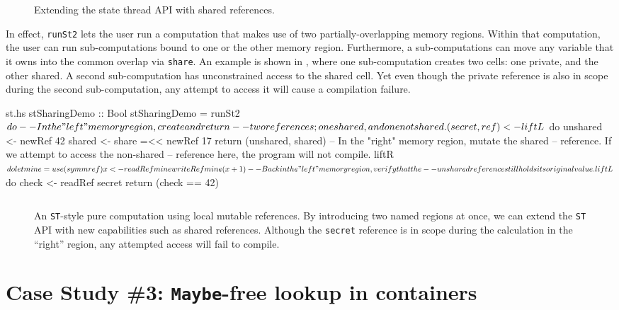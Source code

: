 \documentclass[format=sigplan, review=false, screen=true]{acmart}
\begin{document}
\begin{figure}
  \inputminted{haskell}{st2.hs}
  \caption{Extending the state thread API with shared references.\label{st-sharing-api}}
\end{figure}
In effect, \texttt{runSt2} lets the user run a computation that makes use of
two partially-overlapping memory regions. Within that computation, the user
can run sub-computations bound to one or the other memory region. Furthermore,
a sub-computations can move any variable that it owns into the common overlap
via \texttt{share}. An example is shown in , where one sub-computation
creates two cells: one private, and the other shared. A second sub-computation has unconstrained
access to the shared cell. Yet even though the private reference is also in scope during
the second sub-computation, any attempt to access it will cause a compilation failure.

\begin{filecontents*}{st.hs}
stSharingDemo :: Bool
stSharingDemo = runSt2 $ do
  -- In the "left" memory region, create and return
  -- two references; one shared, and one not shared.
  (secret, ref) <- liftL $ do
      unshared <- newRef 42
      shared   <- share =<< newRef 17
      return (unshared, shared)
  -- In the "right" memory region, mutate the shared
  -- reference. If we attempt to access the non-shared
  -- reference here, the program will not compile.
  liftR $ do
      let mine = use (symm ref)
      x <- readRef mine
      writeRef mine (x + 1)
  -- Back in the "left" memory region, verify that the
  -- unshared reference still holds its original value.
  liftL $ do
      check <- readRef secret
      return (check == 42)
\end{filecontents*}

\begin{figure}
  \inputminted{haskell}{st.hs}
  \caption{An \texttt{ST}-style pure computation using local mutable
    references. By introducing two named regions at once, we can extend
    the \texttt{ST} API with new capabilities such as shared references.
    Although the \texttt{secret} reference is in scope during the calculation
    in the ``right'' region, any attempted access will fail to compile.\label{st-example}}
\end{figure}

\section{Case Study \#3: \texttt{Maybe}-free lookup in containers}
\end{document}
